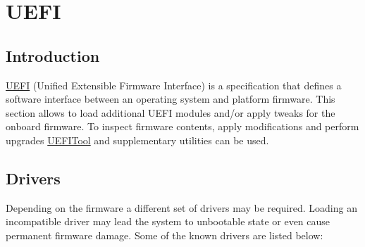 \documentclass[]{article}
\begin{document}
\section{UEFI}\label{uefi}

\subsection{Introduction}\label{uefiintro}

\href{https://uefi.org/specifications}{UEFI} (Unified Extensible Firmware Interface)
is a specification that defines a software interface between an operating system and
platform firmware. This section allows to load additional UEFI modules and/or apply
tweaks for the onboard firmware. To inspect firmware contents, apply modifications
and perform upgrades \href{https://github.com/LongSoft/UEFITool/releases}{UEFITool}
and supplementary utilities can be used.

\subsection{Drivers}\label{uefidrivers}

Depending on the firmware a different set of drivers may be required.
Loading an incompatible driver may lead the system to unbootable state or
even cause permanent firmware damage. Some of the known drivers are listed below:
\end{document}
